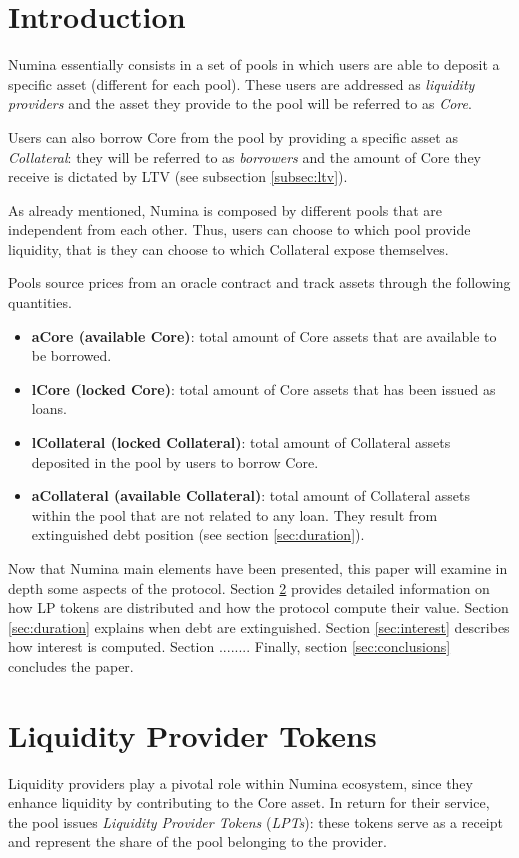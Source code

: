 \documentclass[12pt]{paper}
\begin{document}
\section{Introduction}
\label{sec:introduction}
	Numina essentially consists in a set of pools in which users are able to deposit a specific asset (different for each pool). These users are addressed as \textit{liquidity providers} and the asset they provide to the pool will be referred to as \textit{Core}.
	\par Users can also borrow Core from the pool by providing a specific asset as \textit{Collateral}: they will be referred to as \textit{borrowers} and the amount of Core they receive is dictated by LTV (see subsection \ref{subsec:ltv}).
	\par As already mentioned, Numina is composed by different pools that are independent from each other. Thus, users can choose to which pool provide liquidity, that is they can choose to which Collateral expose themselves.
	\par Pools source prices from an oracle contract and track assets through the following quantities.
	\begin{itemize}
		\item \textbf{aCore (available Core)}: total amount of Core assets that are available to be borrowed.
		\item \textbf{lCore (locked Core)}: total amount of Core assets that has been issued as loans.
		\item \textbf{lCollateral (locked Collateral)}: total amount of Collateral assets deposited in the pool by users to borrow Core.
		\item \textbf{aCollateral (available Collateral)}: total amount of Collateral assets within the pool that are not related to any loan. They result from extinguished debt position (see section \ref{sec:duration}).
	\end{itemize}
	Now that Numina main elements have been presented, this paper will examine in depth some aspects of the protocol. Section \ref{sec:lptoken} provides detailed information on how LP tokens are distributed and how the protocol compute their value. Section \ref{sec:duration} explains when debt are extinguished. Section \ref{sec:interest} describes how interest is computed. Section ........ Finally, section \ref{sec:conclusions} concludes the paper. 
	
\section{Liquidity Provider Tokens}
\label{sec:lptoken}
	Liquidity providers play a pivotal role within Numina ecosystem, since they enhance liquidity by contributing to the Core asset. In return for their service, the pool issues \textit{Liquidity Provider Tokens} (\textit{LPTs}): these tokens serve as a receipt and represent the share of the pool belonging to the provider.
	
\end{document}
